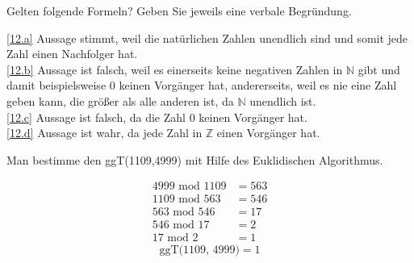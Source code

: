 \documentclass[a4paper, margins=2.5cm]{homework}
\newcommand{\N}{\mathbb{N}}
\newcommand{\Z}{\mathbb{Z}}
\begin{document}
\begin{problem}
	Gelten folgende Formeln? Geben Sie jeweils eine verbale Begründung.
\end{problem}
\begin{solution}
	\ref{12.a}
	Aussage stimmt, weil die natürlichen Zahlen unendlich sind und somit
	jede Zahl einen Nachfolger hat. \\
	\ref{12.b}
	Aussage ist falsch, weil es einerseits keine negativen Zahlen in $\N$ gibt
	und damit beispielsweise $0$ keinen Vorgänger hat, andererseits, weil
	es nie eine Zahl geben kann, die größer als alle anderen ist, da $\N$ unendlich
	ist. \\
	\ref{12.c}
	Aussage ist falsch, da die Zahl $0$ keinen Vorgänger hat. \\
	\ref{12.d}
	Aussage ist wahr, da jede Zahl in $\Z$ einen Vorgänger hat.
\end{solution}

\newpage

\begin{problem}
	Man bestimme den ggT(1109,4999) mit Hilfe des Euklidischen Algorithmus.
\end{problem}
\begin{solution}
	\begin{align*}
		4999 \text{ mod } 1109 &= 563 \\
		1109 \text{ mod } 563  &= 546 \\
		563 \text{ mod } 546   &= 17 \\
		546 \text{ mod } 17    &= 2 \\
		17 \text{ mod } 2      &= 1
	\end{align*}
	\[ \text{ggT(1109, 4999)} = 1 \]
\end{solution}
\end{document}
